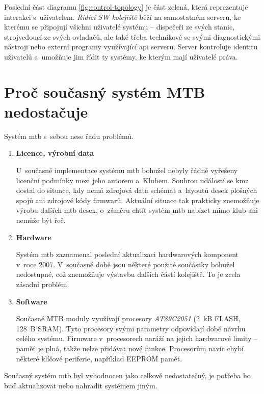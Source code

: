 Poslední část diagramu \ref{fig:control-topology} je část zelená, která
reprezentuje interakci s~uživatelem. \textit{Řídicí SW kolejiště} běží na
samostatném serveru, ke kterému se připojují všichni uživatelé systému –
dispečeři ze svých stanic, strojvedoucí ze svých ovladačů, ale také třeba
technikové se svými diagnostickými nástroji nebo externí programy využívající
\gls{api} serveru. Server kontroluje identitu uživatelů a~umožňuje jim řídit ty
systémy, ke kterým mají uživatelé práva.

\section{Proč současný systém MTB nedostačuje} \label{sec:mtb_fail}

Systém \gls{mtb} s~sebou nese řadu problémů.

\begin{enumerate}
\item \textbf{Licence, výrobní data}

U~současné implementace systému \gls{mtb} bohužel nebyly řádně vyřešeny licenční
podmínky mezi jeho autorem a~Klubem. Souhrou událostí se \gls{kmz} dostal do
situace, kdy nemá zdrojová data schémat a~layoutů desek plošných spojů ani
zdrojové kódy firmwarů.
Aktuální situace tak prakticky znemožňuje výrobu dalších \gls{mtb} desek,
o~záměru chtít systém \gls{mtb} nabízet mimo klub ani nemůže být řeč.

\item \textbf{Hardware}

Systém \gls{mtb} zaznamenal poslední aktualizaci hardwarových komponent v~roce
2007. V~současné době jsou některé použité součástky bohužel nedostupné, což
znemožňuje výstavbu dalších částí kolejiště. To je zcela zásadní problém.

\item \textbf{Software}

Současné MTB moduly využívají procesory \textit{AT89C2051} (2~kB FLASH,
128~B SRAM). Tyto procesory svými parametry odpovídají době návrhu celého
systému. Firmware v~procesorech naráží na jejich hardwarové limity – paměť
je plná, takže nelze přidávat nové funkce. Procesorům navíc chybí některé
klíčové periferie, například EEPROM paměť.

\end{enumerate}

Současný systém \gls{mtb} byl vyhodnocen jako celkově nedostatečný, je potřeba
ho buď aktualizovat nebo nahradit systémem jiným.

